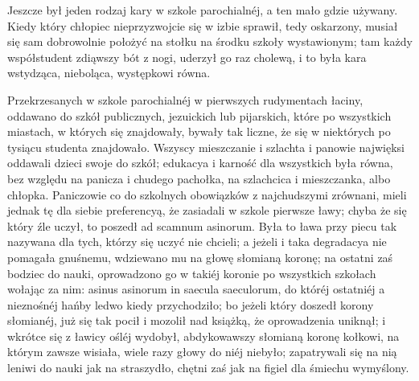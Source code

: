 \documentclass{book}
\begin{document}
Jeszcze był jeden rodzaj kary w szkole parochialnéj, a ten mało gdzie używany. Kiedy który chłopiec nieprzyzwojcie się w izbie sprawił, tedy oskarzony, musiał się sam dobrowolnie położyć na stołku na środku szkoły wystawionym; tam każdy współstudent zdiąwszy bót z nogi, uderzył go raz cholewą, i to była kara wstydząca, nieboląca, występkowi równa.

Przekrzesanych w szkole parochialnéj w pierwszych rudymentach łaciny, oddawano do szkół publicznych, jezuickich lub pijarskich, które po wszystkich miastach, w których się znajdowały, bywały tak liczne, że się w niektórych po tysiącu studenta znajdowało. Wszyscy mieszczanie i szlachta i panowie najwięksi oddawali dzieci swoje do szkół; edukacya i karność dla wszystkich była równa, bez względu na panicza i chudego pachołka, na szlachcica i mieszczanka, albo chłopka. Paniczowie co do szkolnych obowiązków z najchudszymi zrównani, mieli jednak tę dla siebie preferencyą, że zasiadali w szkole pierwsze ławy; chyba że się który źle uczył, to poszedł ad scamnum asinorum. Była to ława przy piecu tak nazywana dla tych, którzy się uczyć nie chcieli; a jeżeli i taka degradacya nie pomagała gnuśnemu, wdziewano mu na głowę słomianą koronę; na ostatni zaś bodziec do nauki, oprowadzono go w takiéj koronie po wszystkich szkołach wołając za nim: asinus asinorum in saecula saeculorum, do któréj ostatniéj a nieznośnéj hańby ledwo kiedy przychodziło; bo jeżeli który doszedł korony słomianéj, już się tak pocił i mozolił nad książką, że oprowadzenia uniknął; i wkrótce się z ławicy ośléj wydobył, abdykowawszy słomianą koronę kołkowi, na którym zawsze wisiała, wiele razy głowy do niéj niebyło; zapatrywali się na nią leniwi do nauki jak na straszydło, chętni zaś jak na figiel dla śmiechu wymyślony.
\end{document}
